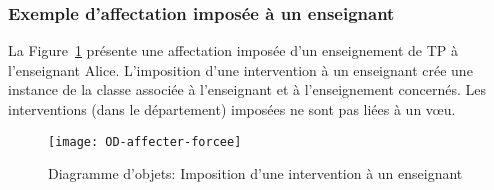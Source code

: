 \subsubsection{Exemple d'affectation imposée à un enseignant}
La Figure~\ref{fig:affectation:imposee} présente une affectation imposée d'un enseignement de TP à l'enseignant Alice.
L'imposition d'une intervention à un enseignant crée une instance de la classe  associée à l'enseignant et à l'enseignement concernés. Les interventions (dans le département) imposées ne sont pas liées à un vœu.

\begin{figure}[!htbp]
\begin{center}
\texttt{[image: OD-affecter-forcee]}
\caption{Diagramme d'objets: Imposition d'une intervention à un enseignant}
\label{fig:affectation:imposee}
\end{center}
\end{figure}


